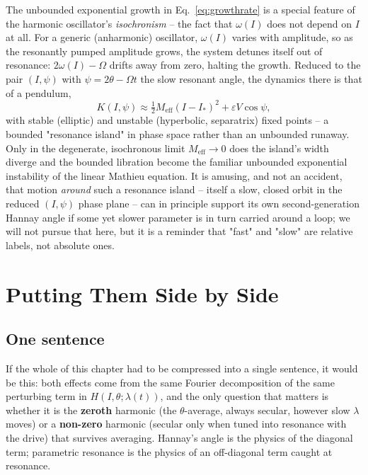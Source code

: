\documentclass[11pt]{book}
\begin{document}
The unbounded exponential growth in Eq.~\eqref{eq:growthrate} is a special feature of the harmonic
oscillator's \emph{isochronism} -- the fact that $\omega(I)$ does not depend on $I$ at all. For a
generic (anharmonic) oscillator, $\omega(I)$ varies with amplitude, so as the resonantly pumped
amplitude grows, the system detunes itself out of resonance: $2\omega(I)-\Omega$ drifts away from
zero, halting the growth. Reduced to the pair $(I,\psi)$ with $\psi = 2\theta-\Omega t$ the slow
resonant angle, the dynamics there is that of a pendulum,
\begin{equation}
K(I,\psi) \approx \tfrac12 M_{\text{eff}}(I-I_\ast)^2 + \varepsilon V\cos\psi,
\end{equation}
with stable (elliptic) and unstable (hyperbolic, separatrix) fixed points -- a bounded "resonance
island" in phase space rather than an unbounded runaway. Only in the degenerate, isochronous limit
$M_{\text{eff}}\to 0$ does the island's width diverge and the bounded libration become the familiar
unbounded exponential instability of the linear Mathieu equation. It is amusing, and not an
accident, that motion \emph{around} such a resonance island -- itself a slow, closed orbit in the
reduced $(I,\psi)$ phase plane -- can in principle support its own second-generation Hannay angle
if some yet slower parameter is in turn carried around a loop; we will not pursue that here, but it
is a reminder that "fast" and "slow" are relative labels, not absolute ones.

\section{Putting Them Side by Side}

\subsection{One sentence}

If the whole of this chapter had to be compressed into a single sentence, it would be this: both
effects come from the same Fourier decomposition of the same perturbing term in $H(I,\theta;\lambda(t))$,
and the only question that matters is whether it is the \textbf{zeroth} harmonic (the
$\theta$-average, always secular, however slow $\lambda$ moves) or a \textbf{non-zero} harmonic
(secular only when tuned into resonance with the drive) that survives averaging. Hannay's angle is
the physics of the diagonal term; parametric resonance is the physics of an off-diagonal term
caught at resonance.
\end{document}
